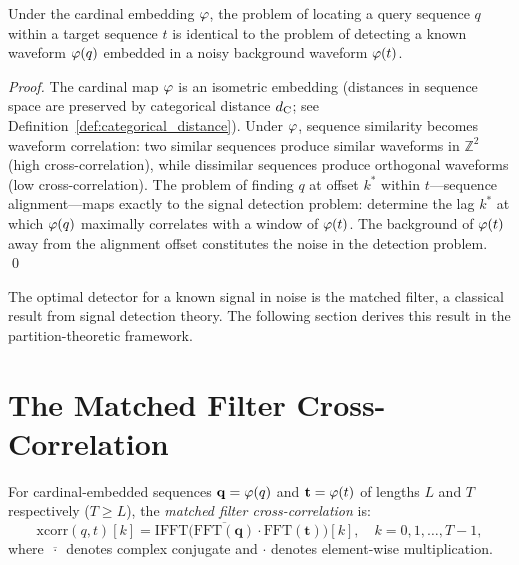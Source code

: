 \begin{proposition}
\label{prop:matching_is_interference}
Under the cardinal embedding $\varphi$, the problem of locating a query
sequence $q$ within a target sequence $t$ is identical to the problem of
detecting a known waveform $\varphi(q)$ embedded in a noisy background
waveform $\varphi(t)$.
\end{proposition}

\begin{proof}
The cardinal map $\varphi$ is an isometric embedding (distances in sequence
space are preserved by categorical distance $d_{\mathrm{C}}$; see
Definition~\ref{def:categorical_distance}). Under $\varphi$, sequence
similarity becomes waveform correlation: two similar sequences produce similar
waveforms in $\mathbb{Z}^2$ (high cross-correlation), while dissimilar sequences
produce orthogonal waveforms (low cross-correlation). The problem of finding
$q$ at offset $k^*$ within $t$---sequence alignment---maps exactly to the
signal detection problem: determine the lag $k^*$ at which $\varphi(q)$
maximally correlates with a window of $\varphi(t)$. The background of
$\varphi(t)$ away from the alignment offset constitutes the noise in the
detection problem. \qed
\end{proof}

The optimal detector for a known signal in noise is the matched filter,
a classical result from signal detection theory. The following section derives
this result in the partition-theoretic framework.

\section{The Matched Filter Cross-Correlation}
\label{sec:matched_filter}

\begin{definition}
\label{def:cross_correlation}
For cardinal-embedded sequences $\mathbf{q} = \varphi(q)$ and
$\mathbf{t} = \varphi(t)$ of lengths $L$ and $T$ respectively ($T \geq L$),
the \emph{matched filter cross-correlation} is:
\begin{equation}
  \mathrm{xcorr}(q, t)[k] = \mathrm{IFFT}\bigl(\overline{\mathrm{FFT}(\mathbf{q})} \cdot \mathrm{FFT}(\mathbf{t})\bigr)[k],
  \quad k = 0, 1, \ldots, T-1,
  \label{eq:xcorr}
\end{equation}
where $\overline{\,\cdot\,}$ denotes complex conjugate and $\cdot$ denotes
element-wise multiplication.
\end{definition}

